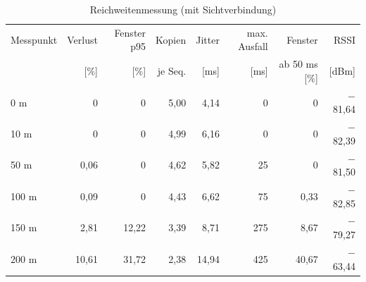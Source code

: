 
\begin{table}[htbp]
  \centering
  \small
  \begin{tabular}{lrrrrrrr}
    \toprule
    Messpunkt & Verlust & Fenster p95 & Kopien & Jitter & max. Ausfall & Fenster & RSSI \\
    & [\%] & [\%] & je Seq. & [ms] & [ms] & ab 50 ms [\%] & [dBm] \\
    \midrule
    0 m & 0 & 0 & 5,00 & 4,14 & 0 & 0 & $-$81,64 \\
    10 m & 0 & 0 & 4,99 & 6,16 & 0 & 0 & $-$82,39 \\
    50 m & 0,06 & 0 & 4,62 & 5,82 & 25 & 0 & $-$81,50 \\
    100 m & 0,09 & 0 & 4,43 & 6,62 & 75 & 0,33 & $-$82,85 \\
    150 m & 2,81 & 12,22 & 3,39 & 8,71 & 275 & 8,67 & $-$79,27 \\
    200 m & 10,61 & 31,72 & 2,38 & 14,94 & 425 & 40,67 & $-$63,44 \\
    \bottomrule
\end{tabular}
\caption{Reichweitenmessung (mit Sichtverbindung)}
  \label{tab:range-summary}
\end{table}
